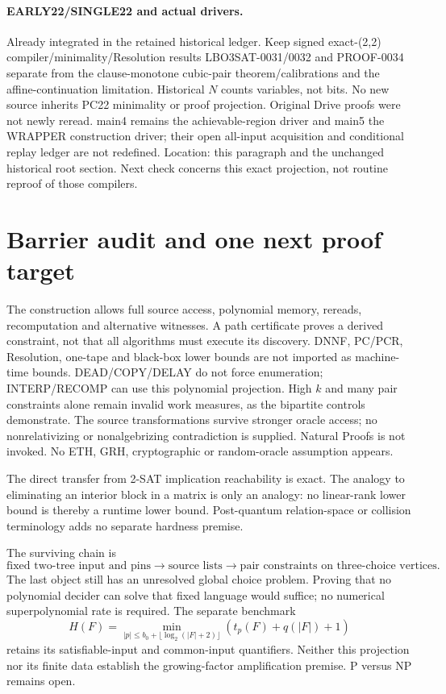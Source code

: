 \documentclass[11pt]{article}
\begin{document}
\paragraph{EARLY22/SINGLE22 and actual drivers.}
Already integrated in the retained historical ledger. Keep signed exact-(2,2)
compiler/minimality/Resolution results LBO3SAT-0031/0032 and PROOF-0034
separate from the clause-monotone cubic-pair theorem/calibrations and the
affine-continuation limitation. Historical $N$ counts variables, not bits.
No new source inherits PC22 minimality or proof projection. Original Drive
proofs were not newly reread. main4 remains the achievable-region driver and
main5 the WRAPPER construction driver; their open all-input acquisition and
conditional replay ledger are not redefined. Location: this paragraph and
the unchanged historical root section. Next check concerns this exact projection,
not routine reproof of those compilers.

\section{Barrier audit and one next proof target}
The construction allows full source access, polynomial memory, rereads,
recomputation and alternative witnesses. A path certificate proves a derived
constraint, not that all algorithms must execute its discovery. DNNF, PC/PCR,
Resolution, one-tape and black-box lower bounds are not imported as machine-time
bounds. DEAD/COPY/DELAY do not force enumeration; INTERP/RECOMP can use this
polynomial projection. High $k$ and many pair constraints alone remain invalid
work measures, as the bipartite controls demonstrate. The source transformations
survive stronger oracle access; no nonrelativizing or nonalgebrizing contradiction
is supplied. Natural Proofs is not invoked. No ETH, GRH, cryptographic or
random-oracle assumption appears.

The direct transfer from 2-SAT implication reachability is exact. The analogy
to eliminating an interior block in a matrix is only an analogy: no linear-rank
lower bound is thereby a runtime lower bound. Post-quantum relation-space or
collision terminology adds no separate hardness premise.

The surviving chain is
\[
 \text{fixed two-tree input and pins}\longrightarrow
 \text{source lists}\longrightarrow\text{pair constraints on three-choice vertices}.
\]
The last object still has an unresolved global choice problem. Proving that
no polynomial decider can solve that fixed language would suffice; no numerical
superpolynomial rate is required. The separate benchmark
\[
 H(F)=\min_{|p|\le b_0+\lfloor\log_2(|F|+2)\rfloor}
                (t_p(F)+q(|F|)+1)
\]
retains its satisfiable-input and common-input quantifiers. Neither this
projection nor its finite data establish the growing-factor amplification
premise. P versus NP remains open.
\end{document}
